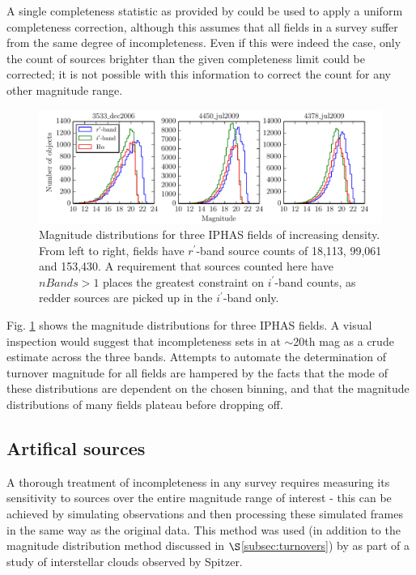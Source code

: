 \documentclass[a4paper,useAMS,usenatbib]{mn2e}
\begin{document}
A single completeness statistic as provided by \citet{Lucas2008} could be used
to apply a uniform completeness correction, although this assumes that all
fields in a survey suffer from the same degree of incompleteness. Even if this
were indeed the case, only the count of sources brighter than the given
completeness limit could be corrected; it is not possible with this information
to correct the count for any other magnitude range.

\begin{figure}
\begin{center}
\includegraphics[width=1\textwidth]{figures/magnitude_turnovers.pdf} 
\caption{\footnotesize Magnitude distributions for three IPHAS fields of 
increasing density. From left to right, fields have $r^{\prime}$-band source 
counts of 18,113, 99,061 and 153,430. A requirement that sources counted here 
have $nBands>1$ places the greatest constraint on $i^{\prime}$-band counts, 
as redder sources are picked up in the $i^{\prime}$-band only.}
\label{fig:magnitude_turnovers}
\end{center}
\end{figure}

Fig. \ref{fig:magnitude_turnovers} shows the magnitude distributions for three IPHAS fields. A visual inspection would suggest that incompleteness sets in at $\sim$20th mag as a crude estimate across the three bands. Attempts to automate the determination of turnover magnitude for all fields are hampered by the facts that the mode of these distributions are dependent on the chosen binning, and that the magnitude distributions of many fields plateau before dropping off.

\subsection{Artifical sources}  
A thorough treatment of incompleteness in any survey requires measuring its
sensitivity to sources over the entire magnitude range of interest - this can be achieved by simulating observations and then processing these simulated frames in the same way as the original data. This method was used (in addition to the magnitude distribution method discussed in $\S$\ref{subsec:turnovers}) by \citet{Harvey2006} as part of a study of interstellar clouds observed by
Spitzer.
\end{document}
